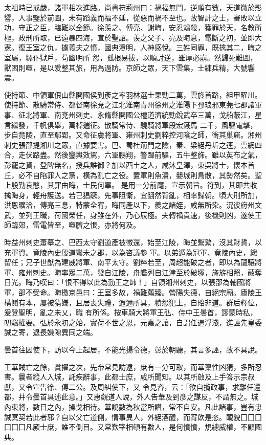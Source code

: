 \begin{pinyinscope}
 太祖時已戒嚴，諸軍相次進路。尚書符荊州曰：禍福無門，逆順有數，天道微於影響，人事鑒於前圖，未有蹈義而福不延，從惡而禍不至也。故智計之士，審敗以立功，守正之臣，臨難以全節。徐羨之、傅亮、謝晦，安忍鴆殺，獲罪於天，名教所極，政刑所取，已遠暴四海，宣於聖詔。羨之父子、亮及晦息，電斷之初，並即大憲。復王室之仇，攄義夫之憤，國典澄明，人神感悅。三姓同罪，既擒其二，晦之室屬，縲仆獄戶，茍幽明所
 怨，孤根易拔，以順討逆，雖厚必崩。然歸死難圖，獸困則噬，是以爰整其旅，用為過防。京師之眾，天下雲集，士練兵精，大號響震。



 使持節、中領軍佷山縣開國侯到彥之率羽林選士果勁二萬，雲旍首路，組甲曜川。使持節、散騎常侍、都督南徐兗之江北淮南青州徐州之淮陽下邳琅邪東莞七郡諸軍事、征北將軍、南兗州刺史、永脩縣開國公檀道濟統勁銳武卒三萬，戈船蔽江，星言繼發，千帆俱舉，萬棹遄征。散騎常侍、驍騎將軍段宏鐵馬
 二千，風驅電擊，步自竟陵，直至鄢郢。又命征虜將軍、雍州刺史劉粹控河陰之師，衝其巢窟。湘州刺史張邵提湘川之眾，直據要害。巴、蜀杜荊門之險，秦、梁絕丹圻之逕，雲網四合，走伏路盡。然後鑾輿效駕，六軍鵬翔，警蹕前驅，五牛整旆。雖以英布之氣，彭寵之資，登陴無名，授兵誰御？加以西土之人，咸沐皇澤，東吳將士，懷本首丘，必不自陷罪人之黨，橫為亂亡之役。置軍則魚潰，嬰城則鳥散，其勢然矣。聖上殷勤哀愍，其罪由晦，士民何辜。
 是用一分前麾，宣示朝旨。符到，其即共收擒晦身，輕舟護送。若已猖蹶，先事阻衛，宜翻然背亂，相率歸朝。頃大刑所加，洪恩曠洽，傅亮三息，特蒙全宥，晦同產以下，羨之諸姪，咸無所染。況彼府州文武，並列王職，荷國榮任，身雖在外，乃心辰極。夫轉禍貴速，後機則凶，遂使王師臨郊，雷電皆至，噬臍之恨，亦將何及。



 時益州刺史蕭摹之、巴西太守劉道產被徵還，始至江陵，晦並繫縶，沒其財貨，以充軍資。竟陵內史殷道鸞未之郡，以為咨議參
 軍。以弟遁為冠軍、竟陵內史，總留任；兄子世猷為建威將軍、南平太守。劉粹若至，周超能破之者，即以為龍驤將軍、雍州刺史。晦率眾二萬，發自江陵，舟艦列自江津至於破塚，旍旂相照，蔽奪日光。晦乃嘆曰：「恨不得以此為勤王之師！」自領湘州刺史，以張邵為輔國將軍，邵不受命。晦檄京邑曰：王室多故，禍難薦臻。營陽失德，自絕宗廟。廬陵王構鬩有本，屢被猜嫌，且居喪失禮，遐邇所具，積怨犯上，自貽非道。群后釋位，爰登聖明，亂之未乂，職
 有所係。按車騎大將軍王弘、侍中王曇首，謬蒙時私，叨竊權要。弘於永初之始，實荷不世之恩，元嘉之讓，自謂任遇浮淺，進誣先皇委誠之寄，退長嫌隙異同之端。



 曇首往因使下，訪以今上起居，不能光揚令德，彰於朝聽，其言多誣，故不具說。



 王華賊亡之餘，賞擢之次，先帝常見訪逮，庶有一分可取，而華稟性凶猜，多所忍害。曩者縱人入城，託疾辭事，此都士庶，咸所聞知。以其所啟及上手答示宗叔獻，又令宣告徐、傅二公。及周糾使下，又
 令見咨，云：「欲自攬政事，求離任還都，并令曇首具述此意。」又惠觀道人說，外人告華及到彥之謀反，不謂無之。城內東將，數日之內，操戈相待。華說數為秋當所譖，常不自安。凡此諸事，豈有忠誠冥契若此者邪？自以父亡道側，情事異人，外絕酒醴，而宵飲是恣。靦貌囗囗囗囗囗囗凡厥士庶，誰不側目。又常歎宰相頓有數人，是何憤憤，規總威權，不顧國典。




\end{pinyinscope}
